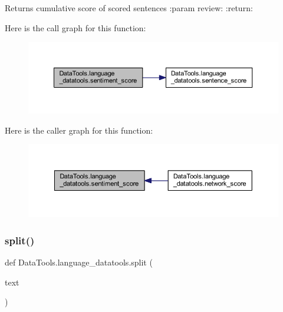 \begin{DoxyVerb}Returns cumulative score of scored sentences
:param review:
:return:
\end{DoxyVerb}
 Here is the call graph for this function\+:
\nopagebreak
\begin{figure}[H]
\begin{center}
\leavevmode
\includegraphics[width=350pt]{namespace_data_tools_1_1language__datatools_a18ef589c882e116d6547b6e5919e3a3a_cgraph}
\end{center}
\end{figure}
Here is the caller graph for this function\+:
\nopagebreak
\begin{figure}[H]
\begin{center}
\leavevmode
\includegraphics[width=350pt]{namespace_data_tools_1_1language__datatools_a18ef589c882e116d6547b6e5919e3a3a_icgraph}
\end{center}
\end{figure}
\mbox{\label{namespace_data_tools_1_1language__datatools_afe62d5ebd637d46169960a826c034ef5}} 
\subsubsection{\texorpdfstring{split()}{split()}}
{\footnotesize\ttfamily def Data\+Tools.\+language\+\_\+datatools.\+split (\begin{DoxyParamCaption}\item[{}]{text }\end{DoxyParamCaption})}

